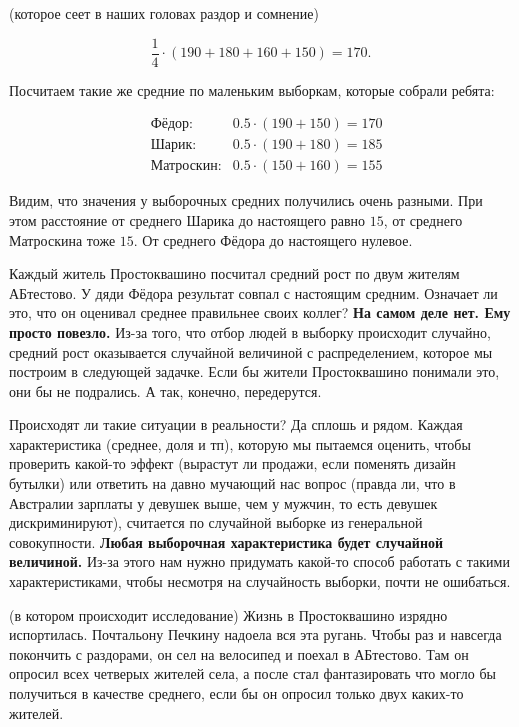 \documentclass[12pt, a4paper, oneside]{article}
\theoremstyle{plain} %
\theoremstyle{definition}
\newcommand{\indef}[1]{\textbf{ \color{green} #1}}
\begin{document}
\begin{problem}{(которое сеет в наших головах раздор и сомнение)}
\begin{solution}
\[
\frac{1}{4} \cdot (190 + 180 + 160 + 150) = 170.
\]

Посчитаем такие же средние по маленьким выборкам, которые собрали ребята: 

\begin{equation*} 
\begin{aligned} 
& \text{Фёдор:}  & 0.5 \cdot (190 + 150) = 170 \\
& \text{Шарик:}  & 0.5 \cdot (190 + 180) = 185 \\
& \text{Матроскин:} & 0.5 \cdot (150 + 160) = 155 
\end{aligned}
\end{equation*}

Видим, что значения у выборочных средних получились очень разными. При этом расстояние от среднего Шарика до настоящего равно $15$, от среднего Матроскина тоже $15$. От среднего Фёдора до настоящего нулевое. 

Каждый житель Простоквашино посчитал средний рост по двум жителям АБтестово. У дяди Фёдора результат совпал с настоящим средним. Означает ли это, что он оценивал среднее правильнее своих коллег?  \indef{На самом деле нет. Ему просто повезло.}  Из-за того, что отбор людей в выборку происходит случайно, средний рост оказывается случайной величиной с распределением, которое мы построим в следующей задачке. Если бы жители Простоквашино понимали это, они бы не подрались. А так, конечно, передерутся. 

Происходят ли такие ситуации в реальности? Да сплошь и рядом. Каждая характеристика (среднее, доля и тп), которую мы пытаемся оценить, чтобы проверить какой-то эффект (вырастут ли продажи, если поменять дизайн бутылки) или ответить на давно мучающий нас вопрос (правда ли, что в Австралии зарплаты у девушек выше, чем у мужчин, то есть девушек дискриминируют), считается по случайной выборке из генеральной совокупности. \indef{Любая выборочная характеристика будет случайной величиной.} Из-за этого нам нужно придумать какой-то способ работать с такими характеристиками, чтобы несмотря на случайность выборки, почти не ошибаться. 
\end{solution}


\begin{problem}{(в котором происходит исследование)}
Жизнь в Простоквашино изрядно испортилась. Почтальону Печкину надоела вся эта ругань. Чтобы раз и навсегда покончить с раздорами, он сел на велосипед и поехал в АБтестово. Там он опросил всех четверых жителей села, а после стал фантазировать что могло бы получиться в качестве среднего, если бы он опросил только двух каких-то жителей. 


\end{problem}
\end{problem}
\end{document}
